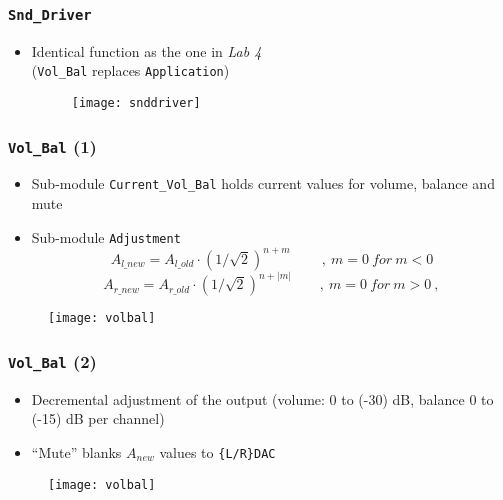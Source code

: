 \begin{frame}
  \frametitle{\texttt{Snd\_Driver}}
    \begin{itemize}
      \item Identical function as the one in \emph{Lab 4}\\ (\texttt{Vol\_Bal} replaces \texttt{Application})
        \begin{figure}
          \centering
          \texttt{[image: snddriver]}
        \end{figure}
    \end{itemize}
\end{frame}

\begin{frame}
  \frametitle{\texttt{Vol\_Bal} (1)}
    \begin{itemize}
      \item Sub-module \texttt{Current\_Vol\_Bal} holds current values for volume, balance and mute
      \item Sub-module \texttt{Adjustment} $$A_{l\_new} = A_{l\_old} \cdot (1/\sqrt{2})^{n + m}\qquad\ ,\ m = 0\ for\ m < 0$$
$$A_{r\_new} = A_{r\_old} \cdot (1/\sqrt{2})^{n + |m|}\qquad,\ m = 0\ for\ m > 0\ ,$$
    \end{itemize}
    \begin{figure}
      \centering
      \texttt{[image: volbal]}
    \end{figure}
\end{frame}


\begin{frame}
  \frametitle{\texttt{Vol\_Bal} (2)}
    \begin{itemize}
      \item Decremental adjustment of the output (volume: 0 to (-30) dB, balance 0 to (-15) dB per channel)
      \item ``Mute'' blanks $A_{new}$ values to \texttt{\{L/R\}DAC}
    \end{itemize}
    \begin{figure}
      \centering
      \texttt{[image: volbal]}
    \end{figure}
\end{frame}


